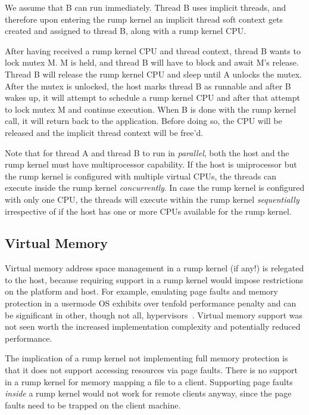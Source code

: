We assume that B can run immediately.  Thread B uses implicit threads, and
therefore upon entering the rump kernel an implicit thread soft context
gets created and assigned to thread B, along with a rump kernel CPU.

After having received a rump kernel CPU and thread context, thread B
wants to lock mutex M.  M is held, and thread B will have to block and
await M's release.  Thread B will release the rump kernel CPU and sleep
until A unlocks the mutex.  After the mutex
is unlocked, the host marks thread B as runnable and after B wakes up,
it will attempt to schedule a rump kernel CPU and after that attempt
to lock mutex M and continue execution.  When B is done with the rump
kernel call, it will return back to the application.  Before doing so,
the CPU will be released and the implicit thread context will be free'd.

Note that for thread A and thread B to run in \textit{parallel}, both
the host and the rump kernel must have multiprocessor capability.
If the host is uniprocessor but the rump kernel is configured with
multiple virtual CPUs, the threads can execute inside the rump
kernel \textit{concurrently}.  In case the rump kernel is configured
with only one CPU, the threads will execute within the rump kernel
\textit{sequentially} irrespective of if the host has one or more CPUs
available for the rump kernel.

\subsection{Virtual Memory}
\label{sect:vmconcept}

Virtual memory address space management in a rump kernel (if any!) is relegated
to the host, because requiring support in a rump kernel would impose
restrictions on the platform and host.  For example, emulating page
faults and memory protection in a usermode OS exhibits over tenfold
performance penalty and can be significant in other, though not all,
hypervisors~\cite{barham:xen}.  Virtual memory support
was not seen worth the increased implementation complexity and
potentially reduced performance.

The implication of a rump kernel not implementing full memory
protection is that it does not support accessing resources via page
faults.  There is no support in a rump kernel for memory mapping a file
to a client.  Supporting page faults \textit{inside} a rump kernel would
not work for remote clients anyway, since the page faults need to be
trapped on the client machine.


